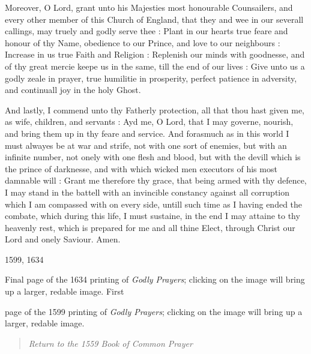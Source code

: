 Moreover, O Lord, grant unto his Majesties most honourable
Counsailers, and every other member of this Church of England, that they
and wee in our severall callings, may truely and godly serve thee : Plant
in our hearts true feare and honour of thy Name, obedience to our Prince,
and love to our neighbours : Increase in us true Faith and Religion :
Replenish our minds with goodnesse, and of thy great mercie keepe us in
the same, till the end of our lives : Give unto us a godly zeale in prayer,
true humilitie in prosperity, perfect patience in adversity, and continuall
joy in the holy Ghost.

And lastly, I commend unto thy Fatherly protection,
all that thou hast given me, as wife, children, and servants : Ayd me,
O Lord, that I may governe, nourish, and bring them up in thy feare and
service. And forasmuch as in this world I must alwayes be at war and strife,
not with one sort of enemies, but with an infinite number, not onely with
one flesh and blood, but with the devill which is the prince of darknesse,
and with which wicked men executors of his most damnable will : Grant
me therefore thy grace, that being armed with thy defence, I may stand
in the battell with an invincible constancy against all corruption which
I am compassed with on every side, untill such time as I having ended
the combate, which during this life, I must sustaine, in the end I may
attaine to thy heavenly rest, which is prepared for me and all thine Elect,
through Christ our Lord and onely Saviour. Amen.

1599,
1634

Final
page of the 1634 printing of \emph{Godly Prayers}; clicking on the image
will bring up a larger, redable image. First

page of the 1599 printing of \emph{Godly Prayers}; clicking on the image
will bring up a larger, redable image.

\begin{quote}

\emph{Return to the 1559
Book of Common Prayer}

\end{quote}
